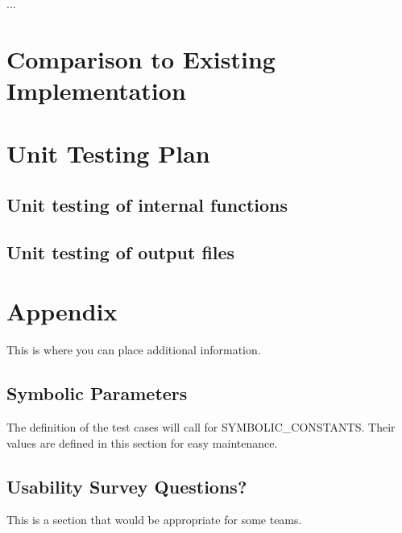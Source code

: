 \documentclass[12pt, titlepage]{article}
\begin{document}
...

	
\section{Comparison to Existing Implementation}	


				
				
\section{Unit Testing Plan}
		
\subsection{Unit testing of internal functions}
		
\subsection{Unit testing of output files}		





\newpage

\section{Appendix}

This is where you can place additional information.

\subsection{Symbolic Parameters}

The definition of the test cases will call for SYMBOLIC\_CONSTANTS.
Their values are defined in this section for easy maintenance.

\subsection{Usability Survey Questions?}

This is a section that would be appropriate for some teams.
\end{document}
